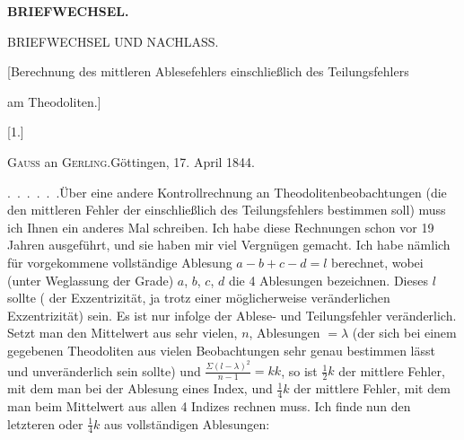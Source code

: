 \par\clearpage
\noindent{}\hfill{\small\textbf{BRIEFWECHSEL.}}\hfill\null\par
\vspace*{3.2cm}
\begin{center}
{\LARGE BRIEFWECHSEL UND NACHLASS.}\par
\vspace{1.5cm}
{\large [Berechnung des mittleren Ablesefehlers einschließlich des Teilungsfehlers\par am Theodoliten.]}\par
\bigskip\bigskip
{\large [1.]}\par\medskip
{\large\textsc{Gauss} an \textsc{Gerling}.\quad Göttingen, 17. April 1844.}
\end{center}
\par\noindent\hspace*{\parindent}.\ .\ .\ .\ .\ .\enspace Über eine andere Kontrollrechnung an Theodolitenbeobachtungen (die den mittleren Fehler der  einschließlich des Teilungsfehlers bestimmen soll) muss ich Ihnen ein anderes Mal schreiben. Ich habe diese Rechnungen schon vor 19 Jahren ausgeführt, und sie haben mir viel Vergnügen gemacht. Ich habe nämlich für  vorgekommene vollständige Ablesung $a-b+c-d=l$ berechnet, wobei (unter Weglassung der Grade) $a$, $b$, $c$, $d$ die 4 Ablesungen bezeichnen. Dieses $l$ sollte ( der Exzentrizität, ja trotz einer möglicherweise veränderlichen Exzentrizität)  sein. Es ist nur infolge der Ablese- und Teilungsfehler veränderlich. Setzt man den Mittelwert aus sehr vielen, $n$, Ablesungen $=\lambda$ (der sich bei einem gegebenen Theodoliten aus vielen Beobachtungen sehr genau bestimmen lässt und unveränderlich sein sollte) und $\frac{\Sigma(l-\lambda)^2}{n-1}=kk$, so ist $\frac12k$ der mittlere Fehler, mit dem man bei der Ablesung eines Index, und $\frac14k$ der mittlere Fehler, mit dem man beim Mittelwert aus allen 4 Indizes rechnen muss. Ich finde nun den letzteren oder $\frac14k$ aus vollständigen Ablesungen:

